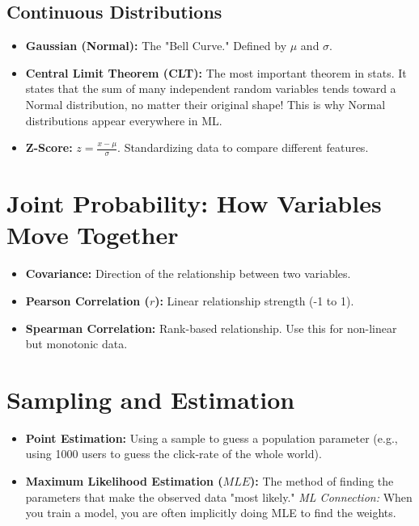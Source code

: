 \documentclass{article}
\begin{document}
\subsection{Continuous Distributions}
\begin{itemize}
    \item \textbf{Gaussian (Normal):} The "Bell Curve." Defined by $\mu$ and $\sigma$. 
    \item \textbf{Central Limit Theorem (CLT):} The most important theorem in stats. It states that the sum of many independent random variables tends toward a Normal distribution, no matter their original shape! This is why Normal distributions appear everywhere in ML.
    \item \textbf{Z-Score:} $z = \frac{x - \mu}{\sigma}$. Standardizing data to compare different features.
\end{itemize}

\section{Joint Probability: How Variables Move Together}
\begin{itemize}
    \item \textbf{Covariance:} Direction of the relationship between two variables.
    \item \textbf{Pearson Correlation ($r$):} Linear relationship strength (-1 to 1).
    \item \textbf{Spearman Correlation:} Rank-based relationship. Use this for non-linear but monotonic data.
\end{itemize}

\section{Sampling and Estimation}
\begin{itemize}
    \item \textbf{Point Estimation:} Using a sample to guess a population parameter (e.g., using 1000 users to guess the click-rate of the whole world).
    \item \textbf{Maximum Likelihood Estimation ($MLE$):} The method of finding the parameters that make the observed data "most likely." 
    \textit{ML Connection:} When you train a model, you are often implicitly doing MLE to find the weights.
\end{itemize}
\end{document}
